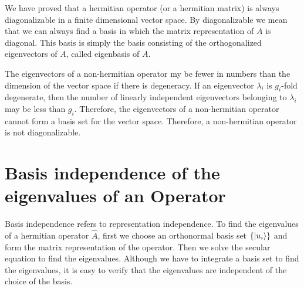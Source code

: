 	
	We have proved that a hermitian operator (or a hermitian matrix) is always diagonalizable in a finite dimensional vector space. By diagonalizable we mean that we can always find a basis in which the matrix representation of $A$ is diagonal. This basis is simply the basis consisting of the orthogonalized eigenvectors of $A$, called eigenbasis of $A$.
	
	
	 The eigenvectors of a non-hermitian operator my be fewer in numbers than the dimension of the vector space if there is degeneracy. If an  eigenvector $\lambda_i$ is $g_i$-fold degenerate, then the number of linearly independent eigenvectors belonging to $\lambda_i$ may be less than $g_i$. Therefore, the eigenvectors of a non-hermitian operator cannot form a basis set for the vector space. Therefore, a non-hermitian operator is not diagonalizable.
	
	
	\section{Basis independence of the eigenvalues of an Operator}
	Basis independence refers to representation independence. To find the eigenvalues of a hermitian operator $\hat{A}$, first we choose an orthonormal basis set $\{\ket{u_i}\}$ and form the matrix representation of the operator. Then we solve the secular equation to find the eigenvalues. Although we have to integrate a basis set to find the eigenvalues, it is easy to verify that the eigenvalues are independent of the choice of the basis. 
	
